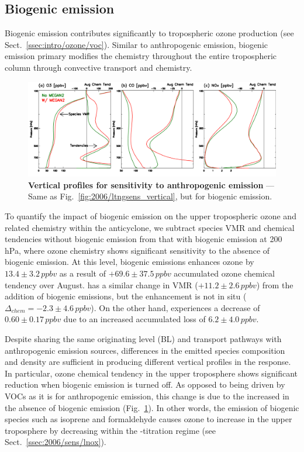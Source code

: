 \subsection{Biogenic emission}\label{ssec:2006/sens/bio}

Biogenic emission contributes significantly to tropospheric ozone production (see Sect.~\ref{ssec:intro/ozone/voc}).
Similar to anthropogenic emission, biogenic emission primary modifies the chemistry throughout the entire tropospheric
column through convective transport and chemistry.

	\begin{figure}[t!]
		\centering
		\includegraphics[width=1.0\textwidth]{sens/biosens_vert}
		\caption[Vertical profiles for sensitivity to anthropogenic emission]{\textbf{Vertical profiles for sensitivity to
		anthropogenic emission} --- Same as Fig.~\ref{fig:2006/ltngsens_vertical}, but for biogenic emission.
		\label{fig:2006/biosens_vert} }\vspace{-.3in}
	\end{figure}

To quantify the impact of biogenic emission on the upper tropospheric ozone and related chemistry within the anticyclone,
we subtract species VMR and chemical tendencies without biogenic emission from that with biogenic emission at
200\,\unit{hPa}, where ozone chemistry shows significant sensitivity to the absence of biogenic emission. At this level,
biogenic emissions enhances ozone by $13.4\pm3.2\,\unit{ppbv}$ as a result of $+69.6\pm37.5\,\unit{ppbv}$ accumulated
ozone chemical tendency over August.  has a similar change in VMR ($+11.2\pm2.6\,\unit{ppbv}$) from the
addition of biogenic emissions, but the enhancement is not in situ ($\Delta_{chem}=-2.3\pm4.6\,\unit{ppbv}$). On the other
hand,  experiences a decrease of $0.60\pm0.17\,\unit{ppbv}$ due to an increased accumulated loss of
$6.2\pm4.0\,\unit{ppbv}$.

Despite sharing the same originating level (BL) and transport pathways with anthropogenic emission sources, differences
in the emitted species composition and density are sufficient in producing different vertical profiles in the response. In
particular, ozone chemical tendency in the upper troposphere shows significant reduction when biogenic emission is
turned off. As opposed to being driven by VOCs as it is for anthropogenic emission, this change is due to the increased
 in the absence of biogenic emission (Fig.~\ref{fig:2006/biosens_vert}). In other words, the emission of
biogenic species such as isoprene and formaldehyde causes ozone to increase in the upper troposphere by decreasing
 within the -titration regime (see Sect.~\ref{ssec:2006/sens/lnox}).


